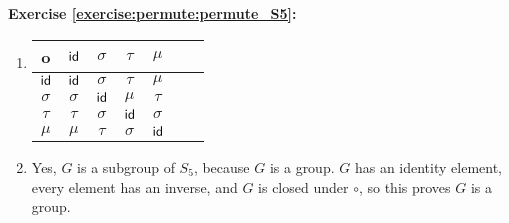 \noindent\textbf{Exercise \ref{exercise:permute:permute_S5}:}
\begin{enumerate}[{a.}]
\item
\begin{tabular}{c| c c c c c c}
		o & $\sf{id}$ & $\sigma$ & $\tau$ & $\mu$\\ \hline
		$\sf{id}$ & $\sf{id}$ & $\sigma$ & $\tau$ & $\mu$\\
		$\sigma$ & $\sigma$ & $\sf{id}$ & $\mu$ & $\tau$\\
		$\tau$ & $\tau$ & $\sigma$ & $\sf{id}$ & $\sigma$\\
		$\mu$ & $\mu$ & $\tau$ & $\sigma$ & $\sf{id}$\\
\end{tabular}

\item
Yes, $G$ is a subgroup of $S_5$, because $G$ is a group.  $G$ has an identity element, every element has an inverse, and $G$ is closed under $\circ$, so this proves $G$ is a group.
\end{enumerate}

